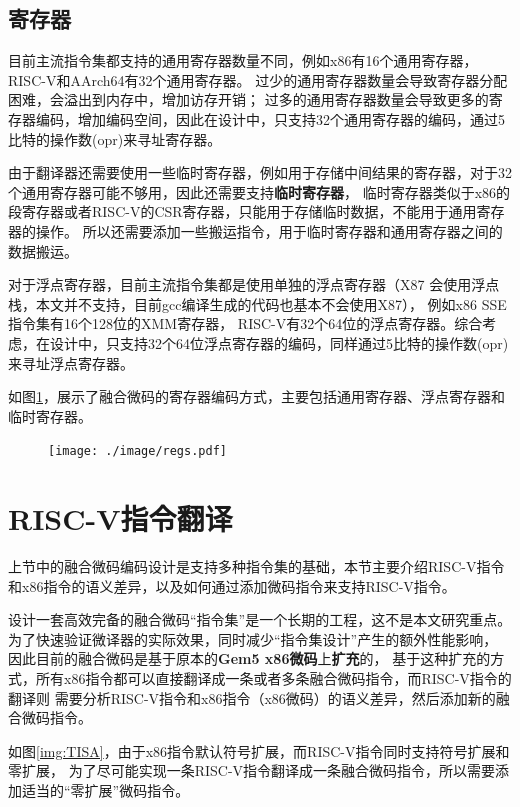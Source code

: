 \subsection{寄存器}

目前主流指令集都支持的通用寄存器数量不同，例如x86有16个通用寄存器，RISC-V和AArch64有32个通用寄存器。
过少的通用寄存器数量会导致寄存器分配困难，会溢出到内存中，增加访存开销；
过多的通用寄存器数量会导致更多的寄存器编码，增加编码空间，因此在设计中，只支持32个通用寄存器的编码，通过5比特的操作数(opr)来寻址寄存器。

由于翻译器还需要使用一些临时寄存器，例如用于存储中间结果的寄存器，对于32个通用寄存器可能不够用，因此还需要支持\textbf{临时寄存器}，
临时寄存器类似于x86的段寄存器或者RISC-V的CSR寄存器，只能用于存储临时数据，不能用于通用寄存器的操作。
所以还需要添加一些搬运指令，用于临时寄存器和通用寄存器之间的数据搬运。

对于浮点寄存器，目前主流指令集都是使用单独的浮点寄存器（X87 会使用浮点栈，本文并不支持，目前gcc编译生成的代码也基本不会使用X87），
例如x86 SSE指令集有16个128位的XMM寄存器，
RISC-V有32个64位的浮点寄存器。综合考虑，在设计中，只支持32个64位浮点寄存器的编码，同样通过5比特的操作数(opr)来寻址浮点寄存器。

如图\ref{img:regs}，展示了融合微码的寄存器编码方式，主要包括通用寄存器、浮点寄存器和临时寄存器。

\begin{figure}[h]
  \centering
  \texttt{[image: ./image/regs.pdf]}
  \label{img:regs}
\end{figure}



\section{RISC-V指令翻译}

上节中的融合微码编码设计是支持多种指令集的基础，本节主要介绍RISC-V指令和x86指令的语义差异，以及如何通过添加微码指令来支持RISC-V指令。

设计一套高效完备的融合微码“指令集”是一个长期的工程，这不是本文研究重点。
为了快速验证微译器的实际效果，同时减少“指令集设计”产生的额外性能影响，
因此目前的融合微码是基于原本的\textbf{Gem5 x86微码}上\textbf{扩充}的，
基于这种扩充的方式，所有x86指令都可以直接翻译成一条或者多条融合微码指令，而RISC-V指令的翻译则
需要分析RISC-V指令和x86指令（x86微码）的语义差异，然后添加新的融合微码指令。

如图\ref{img:TISA}，由于x86指令默认符号扩展，而RISC-V指令同时支持符号扩展和零扩展，
为了尽可能实现一条RISC-V指令翻译成一条融合微码指令，所以需要添加适当的“零扩展”微码指令。

